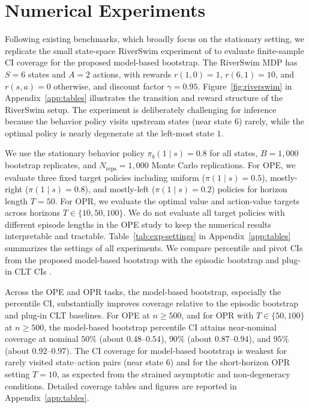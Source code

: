 \documentclass{article}
\numberwithin{equation}{section}
\begin{document}
\section{Numerical Experiments}
\label{sec:experiments}
Following existing benchmarks, which broadly focus on the stationary setting, we replicate the small state-space RiverSwim experiment of \citet{zhu2024uncertainty} to evaluate finite-sample CI coverage for the proposed model-based bootstrap.
The RiverSwim MDP has $S=6$ states and $A=2$ actions, with rewards $r(1,0)=1$, $r(6,1)=10$, and $r(s,a)=0$ otherwise, and discount factor $\gamma=0.95$.
Figure~\ref{fig:riverswim} in Appendix~\ref{app:tables} illustrates the transition and reward structure of the RiverSwim setup.
The experiment is deliberately challenging for inference because the behavior policy visits upstream states (near state $6$) rarely, while the optimal policy is nearly degenerate at the left-most state $1$.

We use the stationary behavior policy $\pi_b(1\mid s)=0.8$ for all states, $B=1{,}000$ bootstrap replicates, and $N_{\mathrm{reps}}=1{,}000$ Monte Carlo replications.
For OPE, we evaluate three fixed target policies including uniform ($\pi(1\mid s)=0.5$), mostly-right ($\pi(1\mid s)=0.8$), and mostly-left ($\pi(1\mid s)=0.2$) policies for horizon length $T=50$.
For OPR, we evaluate the optimal value and action-value targets across horizons $T\in\{10,50,100\}$.
We do not evaluate all target policies with different episode lengths in the OPE study to keep the numerical results interpretable and tractable.
Table~\ref{tab:exp-settings} in Appendix~\ref{app:tables} summarizes the settings of all experiments.
We compare percentile and pivot CIs from the proposed model-based bootstrap with the episodic bootstrap \citep{hao2021bootstrapping} and plug-in CLT CIs \citep{zhu2024uncertainty, su2025centrallimittheoremstransition}.

Across the OPE and OPR tasks, the model-based bootstrap, especially the percentile CI, substantially improves coverage relative to the episodic bootstrap and plug-in CLT baselines.
For OPE at $n\ge 500$, and for OPR with $T\in\{50,100\}$ at $n\ge 500$, the model-based bootstrap percentile CI attains near-nominal coverage at nominal $50\%$ (about $0.48$--$0.54$), $90\%$ (about $0.87$--$0.94$), and $95\%$ (about $0.92$--$0.97$).
The CI coverage for model-based bootstrap is weakest for rarely visited state--action pairs (near state $6$) and for the short-horizon OPR setting $T=10$, as expected from the strained asymptotic and non-degeneracy conditions.
Detailed coverage tables and figures are reported in Appendix~\ref{app:tables}.
\end{document}
